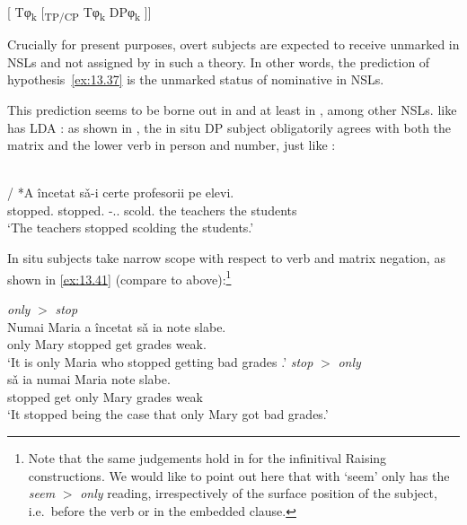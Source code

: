\documentclass[output=paper]{langsci/langscibook}
\begin{document}
\begin{exe}
\ea\label{ex:13.39}
    {}[ Tφ\textsubscript{k} [\textsubscript{TP/CP} Tφ\textsubscript{k} DPφ\textsubscript{k} ]]
\z

Crucially for present purposes, overt subjects are expected to receive unmark\-ed
\Nom{} in \glspl{NSL} and not \Nom{} assigned by  in such a theory.
In other words, the prediction of hypothesis~\eqref{ex:13.37} is the
unmarked status of nominative in NSLs.

This prediction seems to be borne out in  and at least in
, among other NSLs.  like  has \gls{LDA}
\parencite{AleAnaIorMar2012}: as shown in , the in situ DP
subject obligatorily agrees with both the matrix and the lower verb in person
and number, just like :

\ea\label{ex:13.40}\\
     / {*A încetat} sǎ-i certe profesorii pe elevi.\\
    stopped.\Tpl{} {} \hphantom{*}stopped.\Tsg{} \Sbjv{}-\Cl{}.\Tpl{}.\Acc{} scold.\Tpl{} {the teachers} the students\\
    \glt ‘The teachers stopped scolding the students.’
\z

In situ subjects take narrow scope with respect to  verb and
matrix negation, as shown in \eqref{ex:13.41} (compare to 
above):\footnote{Note that the same judgements hold in  for the
    infinitival Raising constructions. We would like to point out here that
    with `seem'  only has the \emph{seem} $>$ \emph{only} reading,
irrespectively of the surface position of the subject, i.e.\ before the 
verb or in the embedded clause.}

\ea%
    \label{ex:13.41}
    \ea \emph{only} $>$ \emph{stop}\\
    \gll   Numai Maria {a încetat} sǎ   ia note slabe.\\
	    only Mary stopped \Sbjv{} get grades weak.\\
	\glt     ‘It is only Maria who stopped getting bad grades .’
    \ex \emph{stop} $>$ \emph{only}\\
     sǎ  ia numai Maria note slabe.\\
	    stopped \Sbjv{} get only Mary grades weak\\
	\glt     ‘It stopped being the case that only Mary got bad grades.’
    \z
\z


\end{exe}
\end{document}
